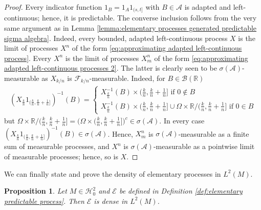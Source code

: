 \documentclass[11pt,a4paper,twoside,openany]{report}
\numberwithin{equation}{section}
\theoremstyle{plain} %
\newtheorem{proposition}[theorem]{Proposition}
\theoremstyle{definition} %
\theoremstyle{remark} %
\begin{document}
\begin{proof}
    Every indicator function \(1_B=1_A1_{(s,t]}\) with \(B\in\mathcal{A}\) is adapted and left-continuous; hence, it is predictable. The converse inclusion follows from the very same argument as in Lemma \ref{lemma:elementary processes generated predictable sigma algebra}. Indeed, every bounded, adapted left-continuous process \(X\) is the limit of processes \(X^n\) of the form \eqref{eq:approximating adapted left-continuous process}. Every \(X^n\) is the limit of processes \(X^n_m\) of the form \eqref{eq:approximating adapted left-continuous processes 2}. The latter is clearly seen to be \(\sigma(\mathcal{A})\)-measurable as \(X_{k/n}\) is \(\mathcal{F}_{k/n}\)-measurable. Indeed, for \(B\in\mathcal{B}(\mathbb{R})\)
    \begin{align*}
    (X_{\frac{k}{n}}1_{(\frac{k}{n},\frac{k}{n}+\frac{1}{n}]})^{-1}(B)=
    \begin{cases}
        X_{\frac{k}{n}}^{-1}(B)\times (\frac{k}{n},\frac{k}{n}+\frac{1}{n}] \text{ if }0\notin B\\
        X_{\frac{k}{n}}^{-1}(B)\times (\frac{k}{n},\frac{k}{n}+\frac{1}{n}]\cup \Omega\times \mathbb{R}/(\frac{k}{n},\frac{k}{n}+\frac{1}{n}]\text{ if }0\in B
    \end{cases}
    \end{align*}
    but \( \Omega\times \mathbb{R}/(\frac{k}{n},\frac{k}{n}+\frac{1}{n}]=\big(\Omega\times(\frac{k}{n},\frac{k}{n}+\frac{1}{n}]\big)^c\in\sigma(\mathcal{A})\). In every case
    \((X_{\frac{k}{n}}1_{(\frac{k}{n},\frac{k}{n}+\frac{1}{n}]})^{-1}(B)\in\sigma(\mathcal{A})\).
    Hence, \(X^n_m\) is \(\sigma(\mathcal{A})\)-measurable as a finite sum of measurable processes, and \(X^n\) is \(\sigma(\mathcal{A})\)-measurable as a pointwise limit of measurable processes; hence, so is \(X\).
\end{proof}
We can finally state and prove the density of elementary processes in \(L^2(M)\).
\begin{proposition}\label{prop:density of E in L2(M) via monotone class}
    Let \(M\in\mathcal{H}^2_0\) and \(\mathcal{E}\) be defined in Definition \ref{def:elementary predictable process}. Then \(\mathcal{E}\) is dense in \(L^2(M)\).
\end{proposition}
\end{document}
